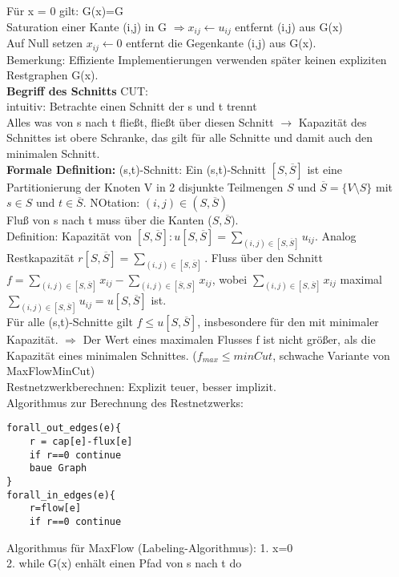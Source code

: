 \documentclass[a4paper]{article}
\begin{document}
Für x = 0 gilt: G(x)=G\\
Saturation einer Kante (i,j) in G $\Rightarrow x_{ij}\leftarrow u_{ij}$ entfernt (i,j) aus G(x)\\
Auf Null setzen $x_{ij}\leftarrow 0$ entfernt die Gegenkante (i,j) aus G(x).\\
Bemerkung: Effiziente Implementierungen verwenden später keinen expliziten Restgraphen G(x).\\
\textbf{Begriff des Schnitts} CUT:\\
intuitiv: Betrachte einen Schnitt der s und t trennt\\
Alles was von s nach t fließt, fließt über diesen Schnitt $\rightarrow$ Kapazität des Schnittes ist obere Schranke, das gilt für alle Schnitte und damit auch den minimalen Schnitt.\\
\textbf{Formale Definition:} (s,t)-Schnitt: Ein (s,t)-Schnitt $[S,\overline{S}]$ ist eine Partitionierung der Knoten V in 2 disjunkte Teilmengen $S$ und $\overline{S}=\{V\setminus S\}$ mit $s\in S$ und $t\in \overline{S}$. NOtation: $(i,j)\in (S,\overline{S})$\\
Fluß von s nach t muss über die Kanten ($S,\overline{S}$). \\
Definition: Kapazität von $[S,\overline{S}]: u[S,\overline{S}] = \sum_{(i,j)\in [S,\overline{S}]} u_{ij}$. Analog Restkapazität $r[S,\overline{S}]=\sum_{(i,j)\in [S,\overline{S}]}$. Fluss über den Schnitt $f=\sum_{(i,j)\in [S,\overline{S}]}x_{ij} -\sum_{(i,j)\in [\overline{S},S]}x_{ij}$, wobei $\sum_{(i,j)\in [S,\overline{S}]}x_{ij}$ maximal $\sum_{(i,j)\in [S,\overline{S}]}u_{ij}=u[S,\overline{S}]$ ist.\\
Für alle (s,t)-Schnitte gilt $f\leq u[S,\overline{S}]$, insbesondere für den mit minimaler Kapazität. $\Rightarrow$ Der Wert eines maximalen Flusses f ist nicht größer, als die Kapazität eines minimalen Schnittes. ($f_{max}\leq minCut$, schwache Variante von MaxFlowMinCut)\\
Restnetzwerkberechnen: Explizit teuer, besser implizit.\\
Algorithmus zur Berechnung des Restnetzwerks:\\
\begin{lstlisting}
forall_out_edges(e){
	r = cap[e]-flux[e]
	if r==0 continue
	baue Graph
}
forall_in_edges(e){
	r=flow[e]
	if r==0 continue
\end{lstlisting}
Algorithmus für MaxFlow (Labeling-Algorithmus):
1. x=0\\
2. while G(x) enhält einen Pfad von s nach t do\\
\end{document}
